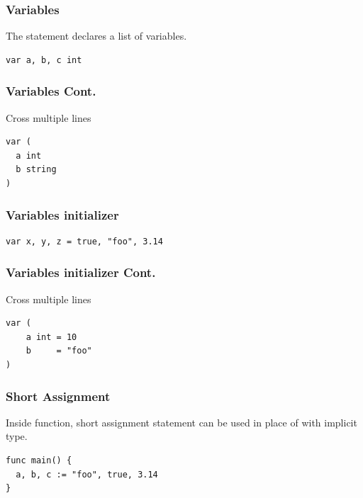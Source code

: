 \documentclass[xetex,mathserif,serif,12pt]{beamer}
\begin{document}
\begin{frame}[fragile]
  \frametitle{Variables}

  The  statement declares a list of variables.
  \newline

  \begin{beamer@nomargin}
    \begin{lstlisting}
var a, b, c int
    \end{lstlisting}
  \end{beamer@nomargin}
\end{frame}

\begin{frame}[fragile]
  \frametitle{Variables Cont.}

  Cross multiple lines
  \newline

  \begin{beamer@nomargin}
    \begin{lstlisting}
var (
  a int
  b string
)
    \end{lstlisting}
  \end{beamer@nomargin}
\end{frame}

\begin{frame}[fragile]
  \frametitle{Variables initializer}

  \begin{beamer@nomargin}
    \begin{lstlisting}
var x, y, z = true, "foo", 3.14
    \end{lstlisting}
  \end{beamer@nomargin}
\end{frame}

\begin{frame}[fragile]
  \frametitle{Variables initializer Cont.}

  Cross multiple lines
  \newline

  \begin{beamer@nomargin}
    \begin{lstlisting}
var (
	a int = 10
	b     = "foo"
)
    \end{lstlisting}
  \end{beamer@nomargin}
\end{frame}

\begin{frame}[fragile]
  \frametitle{Short Assignment}

  \alert{Inside function}, \hltexttt{:=} short assignment statement can
  be used in place of  with implicit type.
  \newline

  \begin{beamer@nomargin}
    \begin{lstlisting}
func main() {
  a, b, c := "foo", true, 3.14
}
    \end{lstlisting}
  \end{beamer@nomargin}
\end{frame}
\end{document}
